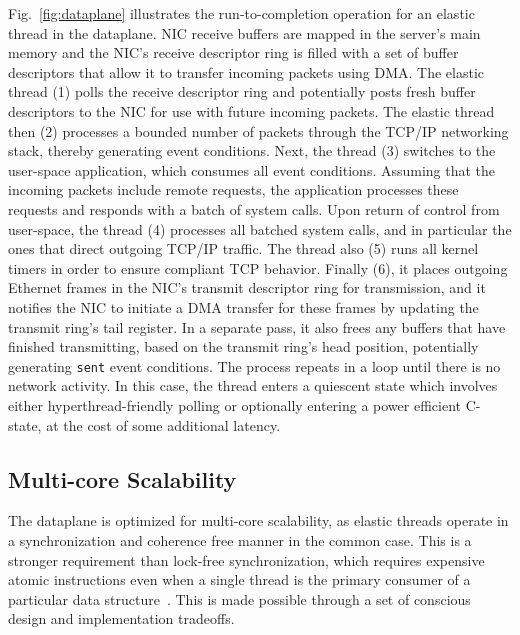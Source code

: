 % 

Fig.~\ref{fig:dataplane} illustrates the run-to-completion operation
for an elastic thread in the \ix dataplane. NIC receive buffers are
mapped in the server's main memory and the NIC's receive descriptor
ring is filled with a set of buffer descriptors that allow it to
transfer incoming packets using DMA\@.  The elastic thread (1) polls
the receive descriptor ring and potentially posts fresh buffer
descriptors to the NIC for use with future incoming packets. The
elastic thread then (2) processes a bounded number of packets through
the TCP/IP networking stack, thereby generating event
conditions. Next, the thread (3) switches to the user-space
application, which consumes all event conditions. Assuming that the
incoming packets include remote requests, the application processes
these requests and responds with a batch of system calls. Upon return
of control from user-space, the thread (4) processes all batched
system calls, and in particular the ones that direct outgoing TCP/IP
traffic. The thread also (5) runs all kernel timers in order to ensure
compliant TCP behavior. Finally (6), it places outgoing Ethernet
frames in the NIC's transmit descriptor ring for transmission, and it
notifies the NIC to initiate a DMA transfer for these frames by
updating the transmit ring's tail register. In a separate pass, it
also frees any buffers that have finished transmitting, based on the
transmit ring's head position, potentially generating \texttt{sent}
event conditions.  The process repeats in a loop until there is no
network activity. In this case, the thread enters a quiescent state which
involves either hyperthread-friendly polling or optionally entering a
power efficient C-state, at the cost of some additional latency.


\subsection{Multi-core Scalability}
\label{sec:impl:cohfree}

The \ix dataplane is optimized for multi-core scalability, as elastic
threads operate in a synchronization and coherence free manner in the
common case. This is a stronger requirement than lock-free
synchronization, which requires expensive atomic instructions even
when a single thread is the primary consumer of a particular data structure~\cite{DBLP:conf/sosp/DavidGT13}.  This is made possible through a
set of conscious design and implementation tradeoffs.

